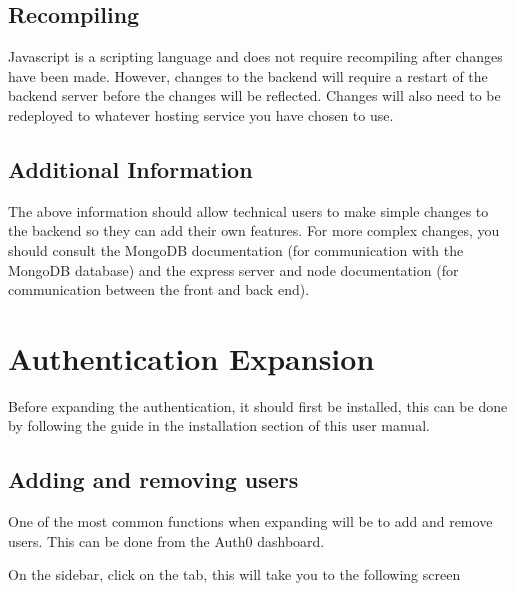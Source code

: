 \documentclass[letterpaper,10pt,english]{sphinxmanual}
\let\sphinxpxdimen\pdfpxdimen\else\newdimen\sphinxpxdimen
\let\oldsubsection\subsection
\renewcommand{\subsection}{\needspace{6\baselineskip}\oldsubsection}
\begin{document}
\subsection{Recompiling}
\label{\detokenize{docs/Expansion/api-expansion:recompiling}}
Javascript is a scripting language and does not require recompiling
after changes have been made. However, changes to the back\sphinxhyphen{}end will
require a restart of the back\sphinxhyphen{}end server before the changes will be
reflected. Changes will also need to be redeployed to whatever hosting
service you have chosen to use.


\subsection{Additional Information}
\label{\detokenize{docs/Expansion/api-expansion:additional-information}}
The above information should allow technical users to make simple
changes to the back\sphinxhyphen{}end so they can add their own features. For more
complex changes, you should consult the MongoDB documentation (for
communication with the MongoDB database) and the express server and node
documentation (for communication between the front and back end).


\section{Authentication Expansion}
\label{\detokenize{docs/Expansion/auth-expansion:authentication-expansion}}\label{\detokenize{docs/Expansion/auth-expansion::doc}}
Before expanding the authentication, it should first be installed, this
can be done by following the guide in the installation section of this
user manual.


\subsection{Adding and removing users}
\label{\detokenize{docs/Expansion/auth-expansion:adding-and-removing-users}}
One of the most common functions when expanding will be to add and
remove users. This can be done from the Auth0 dashboard.

On the sidebar, click on the  tab, this will take you
to the following screen

\noindent{\hspace*{\fill}\sphinxincludegraphics[width=500\sphinxpxdimen]{{add_users}.png}\hspace*{\fill}}
\end{document}
